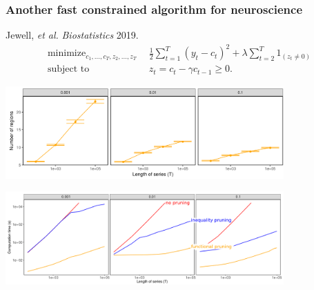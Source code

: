 \documentclass{beamer}
\DeclareMathOperator*{\minimize}{minimize}
\begin{document}
\begin{frame}
  \frametitle{Another fast constrained algorithm for neuroscience}
  Jewell, {\it et al.} {\it Biostatistics} 2019.
\vskip -0.5cm
\begin{align*}
    \minimize_{c_1,\dots,c_T, z_2, \dots, z_T} &\ \ 
    \frac 1 2 \sum_{t=1}^T (y_t-c_t)^2  + 
\lambda\sum_{t=2}^{T} 1_{(z_t\neq 0)}
\\
      \text{subject to} &\ \ z_t = c_t - \gamma c_{t-1} \geq 0.
  \nonumber 
\end{align*}

\centering

\includegraphics[width=0.8\textwidth]{screenshot-jewell-intervals}

\includegraphics[width=0.8\textwidth]{screenshot-jewell-timings-labels}
  
\end{frame}
\end{document}
